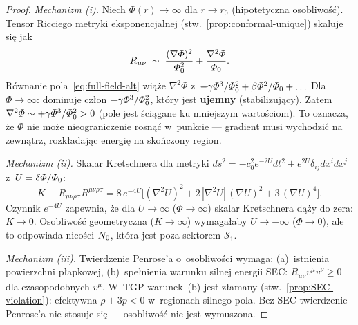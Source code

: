 \begin{proof}
\emph{Mechanizm (i).}\;
Niech $\Phi(r) \to \infty$ dla $r \to r_0$ (hipotetyczna osobliwo\'s\'c).
Tensor Ricciego metryki eksponencjalnej
(stw.~\ref{prop:conformal-unique}) skaluje si\k{e} jak
\begin{equation}\label{eq:Ricci-scaling}
  R_{\mu\nu} \;\sim\; \frac{(\nabla\varPhi)^2}{\varPhi_0^2}
  + \frac{\nabla^2\varPhi}{\varPhi_0}.
\end{equation}
R\'ownanie pola~\eqref{eq:full-field-alt} wi\k{a}\.ze $\nabla^2\Phi$
z~$-\gamma\varPhi^3/\varPhi_0^2 + \beta\varPhi^2/\varPhi_0 + \ldots$
Dla $\Phi \to \infty$: dominuje cz\l{}on $-\gamma\varPhi^3/\varPhi_0^2$,
kt\'ory jest \textbf{ujemny} (stabilizuj\k{a}cy). Zatem
$\nabla^2\varPhi \sim +\gamma\varPhi^3/\varPhi_0^2 > 0$
(pole jest \'sci\k{a}gane ku mniejszym warto\'sciom).
To oznacza, \.ze $\Phi$ nie mo\.ze nieograniczenie rosn\k{a}\'c
w~punkcie --- gradient musi wychodzi\'c na zewn\k{a}trz,
rozk\l{}adaj\k{a}c energi\k{e} na sko\'nczony region.

\emph{Mechanizm (ii).}\;
Skalar Kretschnera dla metryki $ds^2 = -c_0^2 e^{-2U}dt^2
+ e^{2U}\delta_{ij}dx^i dx^j$ z~$U = \delta\varPhi/\varPhi_0$:
\begin{equation}\label{eq:Kretschner}
  K \equiv R_{\mu\nu\rho\sigma}R^{\mu\nu\rho\sigma}
  = 8\,e^{-4U}\bigl[
    (\nabla^2 U)^2 + 2\,|\nabla^2 U|\,(\nabla U)^2
    + 3\,(\nabla U)^4
  \bigr].
\end{equation}
Czynnik $e^{-4U}$ zapewnia, \.ze dla $U \to \infty$
($\Phi \to \infty$) skalar Kretschnera d\k{a}\.zy do zera:
$K \to 0$. Osobliwo\'s\'c geometryczna ($K \to \infty$)
wymaga\l{}aby $U \to -\infty$ ($\Phi \to 0$), ale
to odpowiada nico\'sci $N_0$, kt\'ora jest poza
sektorem $\mathcal{S}_1$.

\emph{Mechanizm (iii).}\;
Twierdzenie Penrose'a o~osobliwo\'sci wymaga:
(a)~istnienia powierzchni p\l{}apkowej,
(b)~spe\l{}nienia warunku silnej energii SEC:
$R_{\mu\nu}v^\mu v^\nu \geq 0$ dla czasopodobnych $v^\mu$.
W~TGP warunek~(b) jest z\l{}amany
(stw.~\ref{prop:SEC-violation}): efektywna
$\rho + 3p < 0$ w~regionach silnego pola.
Bez SEC twierdzenie Penrose'a nie stosuje si\k{e}
--- osobliwo\'s\'c nie jest wymuszona.
\end{proof}

